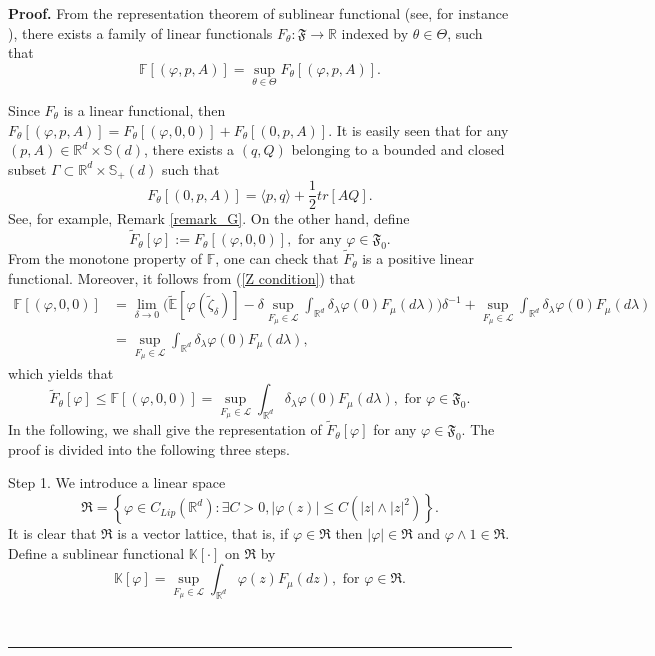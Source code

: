 \documentclass[a4paper,oneside,10pt]{article}%
\newenvironment{proof}[1][Proof]{\noindent \textbf{#1.} }{\  \rule{0.5em}{0.5em}}
\numberwithin{equation}{section}
\begin{document}
\begin{proof}
From the representation theorem of sublinear functional (see, for instance
\cite[Theorem 1.2.1]{P2010}), there exists a family of linear functionals
$F_{\theta}:\mathfrak{F}\mathbb{\rightarrow R}$ indexed by $\theta \in \Theta$,
such that
\begin{equation}
\mathbb{F}[(\varphi,p,A)]=\sup_{\theta \in \Theta}F_{\theta}[(\varphi,p,A)].
\label{2.6}%
\end{equation}


Since $F_{\theta}$ is a linear functional, then $F_{\theta}[(\varphi
,p,A)]=F_{\theta}[(\varphi,0,0)]+F_{\theta}[(0,p,A)]$. It is easily seen that
for any $(p,A)\in \mathbb{R}^{d}\times \mathbb{S}(d)$, there exists a $(q,Q)$
belonging to a bounded and closed subset $\Gamma \subset \mathbb{R}^{d}%
\times \mathbb{S}_{+}(d)$ such that
\begin{equation}
F_{\theta}[(0,p,A)]=\langle p,q\rangle+\frac{1}{2}tr[AQ]. \label{2.7}%
\end{equation}
See, for example, Remark \ref{remark_G}. On the other hand, define
\[
\tilde{F}_{\theta}[\varphi]:=F_{\theta}[(\varphi,0,0)],\text{ \ for any }
\varphi \in \mathfrak{F}_{0}.
\]
From the monotone property of $\mathbb{F}$, one can check that $\tilde
{F}_{\theta}$ is a positive linear functional. Moreover, it follows from
(\ref{Z condition}) that
\begin{align*}
\mathbb{F}[(\varphi,0,0)]  &  =\lim_{\delta \rightarrow0}\bigg(\mathbb{\tilde
{E}} [\varphi(\tilde{\zeta}_{\delta})]-\delta \sup \limits_{F_{\mu}%
\in \mathcal{L}}\int_{\mathbb{R}^{d}}\delta_{\lambda}\varphi(0)F_{\mu}%
(d\lambda) \bigg)\delta^{-1}+\sup \limits_{F_{\mu}\in \mathcal{L}}%
\int_{\mathbb{R} ^{d}}\delta_{\lambda}\varphi(0)F_{\mu}(d\lambda)\\
&  =\sup \limits_{F_{\mu}\in \mathcal{L}}\int_{\mathbb{R}^{d}}\delta_{\lambda
}\varphi(0)F_{\mu}(d\lambda),
\end{align*}
which yields that
\begin{equation}
\tilde{F}_{\theta}[\varphi]\leq \mathbb{F}[(\varphi,0,0)]= \sup \limits_{F_{\mu
}\in \mathcal{L}}\int_{\mathbb{R}^{d}}\delta_{\lambda} \varphi(0)F_{\mu
}(d\lambda),\text{ for }\varphi \in \mathfrak{F}_{0}. \label{2.0}%
\end{equation}
In the following, we shall give the representation of $\tilde{F}_{\theta
}[\varphi]$ for any $\varphi \in \mathfrak{F}_{0}$. The proof is divided into
the following three steps.

Step 1. We introduce a linear space
\[
\mathfrak{R}=\left \{  \varphi \in C_{Lip}(\mathbb{R}^{d}):\exists C>0,
|\varphi(z)|\leq C(|z|\wedge|z|^{2})\right \}  .
\]
It is clear that $\mathfrak{R}$ is a vector lattice, that is, if $\varphi
\in \mathfrak{R}$ then $|\varphi|\in \mathfrak{R}$ and $\varphi \wedge
1\in \mathfrak{R}$. Define a sublinear functional $\mathbb{K}[\cdot]$ on
$\mathfrak{R}$ by
\[
\mathbb{K}[\varphi]=\sup \limits_{F_{\mu}\in \mathcal{L}} \int_{\mathbb{R}^{d}%
}\varphi(z)F_{\mu}(dz),\text{ for }\varphi \in \mathfrak{R}.
\]



\end{proof}
\end{document}
